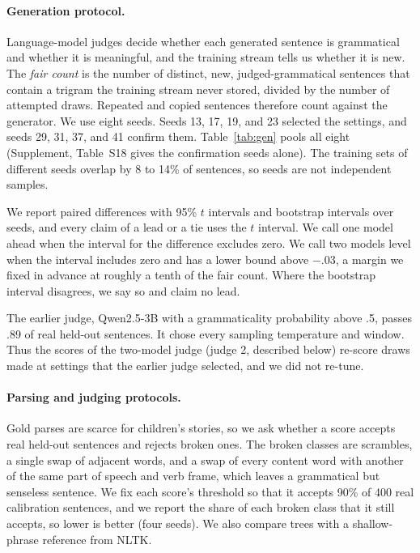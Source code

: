 \documentclass[11pt,letterpaper]{article}
\begin{document}
\paragraph{Generation protocol.} Language-model judges decide whether each generated sentence is grammatical and whether it is meaningful, and the training stream tells us whether it is new.
The \textit{fair count} is the number of distinct, new, judged-grammatical sentences that contain a trigram the training stream never stored, divided by the number of attempted draws. Repeated and copied sentences therefore count against the generator.
We use eight seeds. Seeds 13, 17, 19, and 23 selected the settings, and seeds 29, 31, 37, and 41 confirm them. Table~\ref{tab:gen} pools all eight (Supplement, Table~S18 gives the confirmation seeds alone).
The training sets of different seeds overlap by 8 to 14\% of sentences, so seeds are not independent samples.

We report paired differences with 95\% $t$ intervals and bootstrap intervals over seeds, and every claim of a lead or a tie uses the $t$ interval.
We call one model ahead when the interval for the difference excludes zero. We call two models level when the interval includes zero and has a lower bound above $-.03$, a margin we fixed in advance at roughly a tenth of the fair count.
Where the bootstrap interval disagrees, we say so and claim no lead.

The earlier judge, Qwen2.5-3B \citep{qwen25} with a grammaticality probability above .5, passes .89 of real held-out sentences. It chose every sampling temperature and window.
Thus the scores of the two-model judge (judge 2, described below) re-score draws made at settings that the earlier judge selected, and we did not re-tune.

\paragraph{Parsing and judging protocols.} Gold parses are scarce for children's stories, so we ask whether a score accepts real held-out sentences and rejects broken ones.
The broken classes are scrambles, a single swap of adjacent words, and a swap of every content word with another of the same part of speech and verb frame, which leaves a grammatical but senseless sentence.
We fix each score's threshold so that it accepts 90\% of 400 real calibration sentences, and we report the share of each broken class that it still accepts, so lower is better (four seeds). We also compare trees with a shallow-phrase reference from NLTK.
\end{document}
